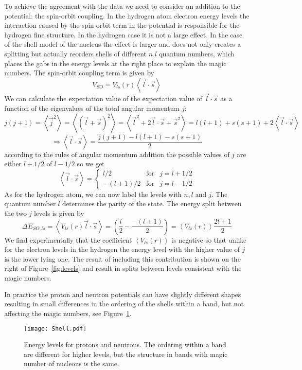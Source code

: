 \documentclass[12pt]{article}
\begin{document}
To achieve the agreement with the data we need to consider an addition to the potential: the spin-orbit coupling. In the hydrogen atom electron energy levels the interaction caused by the spin-orbit term in the potential is responsible for the hydrogen fine structure. In the hydrogen case it is not a large effect. In the case of the shell model of the nucleus the effect is larger and does not only creates a splitting but actually reorders shells of different $n.l$ quantum numbers, which places the gabs in the energy levels at the right place to explain the magic numbers. The spin-orbit coupling term is given by 
\[V_{SO}=V_{ls}(r)\left<\vec{l}\cdot\vec{s}\right>\] 
We can calculate the expectation value of the expectation value of $\vec{l}\cdot\vec{s}$ as a function of the eigenvalues of the total angular momentum $j$:
\[
j(j+1)=\left<\vec{j}^2\right>=\left<(\vec{l}+\vec{s})^2\right>
=
\left<\vec{l}^2+2\vec{l}\cdot\vec{s}+\vec{s}^2\right>
=l(l+1)+s(s+1)+2\left<\vec{l}\cdot\vec{s}\right>
\]
\[\Rightarrow
\left<\vec{l}\cdot\vec{s}\right>=\frac{j(j+1)-l(l+1)-s(s+1)}{2}
\]
according to the rules of angular momentum addition the possible values of $j$ are either $l+1/2$ of $l-1/2$ so we get
\[\left<\vec{l}\cdot\vec{s}\right>=\left\{\begin{array}{rcc}
l/2&\mbox{for}& j=l+1/2\\
-(l+1)/2&\mbox{for}& j=l-1/2
\end{array}\right.\]
As for the hydrogen atom, we can now label the levels with $n,l$ and $j$. The quantum number $l$ determines the parity of the state. The energy split between the two $j$ levels is given by
\[
\Delta E_{SO,ls}=\left<V_{ls}(r) \vec{l}\cdot\vec{s}\right>=
\left(\frac{l}{2}-\frac{-(l+1)}{2}\right)=\left<V_{ls}(r)\right>\frac{2l+1}{2}
\]
We find experimentally that the coefficient $\left<V_{ls}(r)\right>$ is negative so that unlike for the electron levels in the hydrogen the energy level with the higher value of $j$ is the lower lying one. The result of including this contribution is shown on the right of Figure~\ref{fig:levels} and result in splits between levels consistent with the magic numbers. 

In practice the proton and neutron potentials can have slightly different shapes resulting in small differences in the ordering of the shells within a band, but not affecting the magic numbers, see Figure~\ref{fig:pnlevels}. 

   
\begin{figure}
\begin{center}
\texttt{[image: Shell.pdf]}
\caption{Energy levels for protons and neutrons. The ordering within a band are different for higher levels, but the structure in bands with magic number of nucleons is the same.}\label{fig:pnlevels}
\end{center}
\end{figure}
\end{document}
